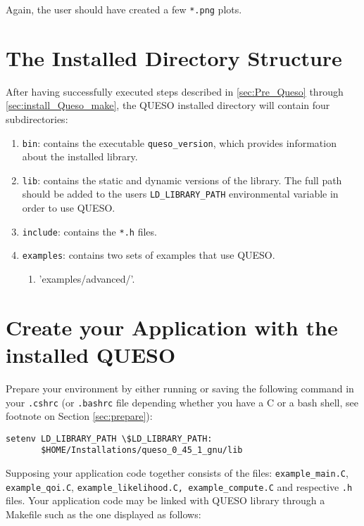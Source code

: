 Again, the user should have created a few \verb+*.png+ plots.

\section{The Installed Directory Structure} \label{sc-installed-dir-structure}

After having successfully executed steps described in \textsection{}\ref{sec:Pre_Queso} through \textsection{}\ref{sec:install_Queso_make}, the QUESO installed directory will contain four subdirectories:
\begin{enumerate}
 \item \verb+bin+: contains the executable \verb+queso_version+, which provides information about the installed library.
 \item \verb+lib+: contains the static and dynamic versions of the library. The full path should be added to the users \verb+LD_LIBRARY_PATH+ environmental variable in order to use QUESO.
 \item \verb+include+: contains the \verb+*.h+ files.
 \item \verb+examples+: contains two sets of examples that use QUESO.
  \begin{enumerate}
	\item 'examples/advanced/'.
  \end{enumerate}
\end{enumerate}


\section{Create your Application with the installed QUESO} \label{sc-use-queso}

Prepare your environment by either running or saving the following command in your \verb+.cshrc+ (or \verb+.bashrc+ file depending whether you have a C or a bash shell, see footnote on Section \ref{sec:prepare}):

\begin{lstlisting}[label={},caption={}]
setenv LD_LIBRARY_PATH \$LD_LIBRARY_PATH:
       $HOME/Installations/queso_0_45_1_gnu/lib
\end{lstlisting}


Supposing your application code together consists of the files: \linebreak \verb+example_main.C+, \verb+example_qoi.C+,  \verb+example_likelihood.C, example_compute.C+ and respective \verb+.h+ files. Your application code may be linked with QUESO library through a Makefile such as the one displayed as follows:

